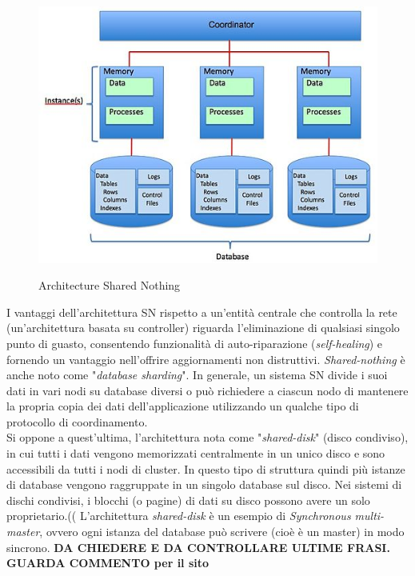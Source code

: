\begin{figure}[htbp]
\centering
\includegraphics[scale=0.70]{img/Shared_Nothing_Architecture.jpg}\\
\caption{Architecture Shared Nothing \label{figura1.1} \cite{etichetta7}}
\end{figure}

I vantaggi dell'architettura SN rispetto a un'entit\`{a} centrale che controlla la rete (un'architettura basata su controller) riguarda l'eliminazione di qualsiasi singolo punto di guasto, consentendo funzionalit\`{a} di auto-riparazione (\textit{self-healing}) e fornendo un vantaggio nell'offrire aggiornamenti non distruttivi.\cite{etichetta6} 
\textit{Shared-nothing} \`{e} anche noto come "\textit{database sharding}". In generale, un sistema SN divide i suoi dati in vari nodi su database diversi o pu\`{o} richiedere a ciascun nodo di mantenere la propria copia dei dati dell'applicazione utilizzando un qualche tipo di protocollo di coordinamento.\cite{etichetta5}\\


Si oppone a quest'ultima, l'architettura nota come "\textit{shared-disk}" (disco condiviso), in cui tutti i dati vengono memorizzati centralmente in un unico disco e sono accessibili da tutti i nodi di cluster.\cite{etichetta7} In questo tipo di struttura quindi pi\`{u} istanze di database vengono raggruppate in un singolo database sul disco. Nei sistemi di dischi condivisi, i blocchi (o pagine) di dati su disco possono avere un solo proprietario.((
L'architettura \textit{shared-disk} \`{e} un esempio di \textit{Synchronous multi-master}, ovvero ogni istanza del database pu\`{o} scrivere (cio\`{e} \`{e} un master) in modo sincrono.\cite{etichetta7}
\textbf{DA CHIEDERE E DA CONTROLLARE ULTIME FRASI. GUARDA COMMENTO per il sito}

